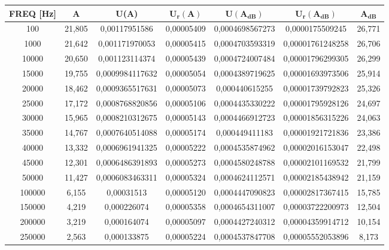 \begin{table}[!ht]
    \centering
    \begin{tabular}{|c|c|c|c|c|c|c|}
    \hline

        \textbf{FREQ [Hz]} & \textbf{A} & \textbf{U(A)} & $\bm{U_r(A)}$ & $\bm{U(A_{dB})}$ & $\bm{U_r(A_{dB})}$ & $\bm{A_{dB}}$  \\ \hline

	100	   & 21,805	& 0,00117951586 &	0,00005409	& 0,0004698567273 &	0,0000175509245	& 26,771 \\ \hline
        1000	& 21,642 & 	0,001171970053 &	0,00005415	& 0,0004703593319 &	0,00001761248258 &	26,706 \\ \hline
        10000	& 20,650 &	0,001123114374 &	0,00005439 &	0,0004724007484 &	0,00001796299305 &	26,299 \\ \hline
        15000	& 19,755 &	0,0009984117632 &	0,00005054 &	0,0004389719625	& 0,00001693973506 &	25,914 \\ \hline
        20000	& 18,462 &	0,0009365517631	& 0,00005073 &	0,000440615255	& 0,00001739792823 &	25,326 \\ \hline
        25000	& 17,172 &	0,0008768820856	& 0,00005106 &	0,0004435330222	& 0,00001795928126 &	24,697 \\ \hline
        30000	& 15,965 &	0,0008210312675	& 0,00005143 &	0,0004466912723	& 0,00001856315226 &	24,063 \\ \hline
        35000	& 14,767 &	0,0007640514088	& 0,00005174 &	0,000449411183	& 0,00001921721836 &	23,386 \\ \hline
        40000	& 13,332 &	0,0006961941325	& 0,00005222 &	0,0004535874962	& 0,00002016153047 &	22,498 \\ \hline
        45000	& 12,301 &	0,0006486391893	& 0,00005273 &	0,0004580248788	& 0,00002101169532 & 	21,799 \\ \hline
        50000	& 11,427 &	0,0006083463311	& 0,00005324 &	0,0004624112571	& 0,00002185438942 &	21,159  \\ \hline
        100000	& 6,155	& 0,00031513	& 0,00005120 &	0,0004447090823	& 0,00002817367415	& 15,785 \\ \hline
        150000	& 4,219	& 0,000226074	& 0,00005358 &	0,0004654311007	& 0,00003722200973	& 12,504 \\ \hline
        200000	& 3,219	& 0,000164074	& 0,00005097 &	0,0004427240312	& 0,00004359914712	& 10,154 \\ \hline
        250000	& 2,563	& 0,000133875	& 0,00005224 &	0,0004537847708	& 0,00005552053896	& 8,173 \\ \hline

\end{tabular}
\end{table}
